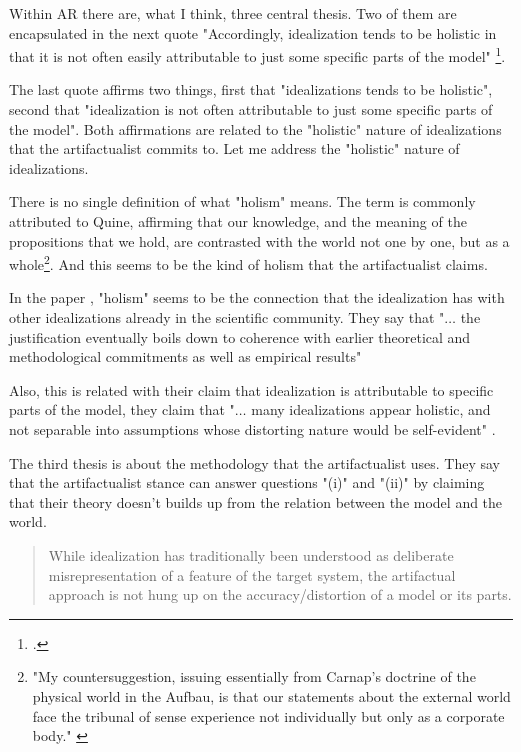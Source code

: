 Within AR there are, what I think, three central thesis.
Two of them are encapsulated in the next quote "Accordingly, idealization tends to be holistic in that it is not often easily attributable to just some specific parts of the model" \footcite[][p. 3]{Carrillo2021-CARAAP-12}.

The last quote affirms two things, first that "idealizations tends to be holistic", second that "idealization is not often attributable to just some specific parts of the model".
Both affirmations are related to the "holistic" nature of idealizations that the artifactualist commits to.
Let me address the "holistic" nature of idealizations.

There is no single definition of what "holism" means.
The term is commonly attributed to Quine, affirming that our knowledge, and the meaning of the propositions that we hold, are contrasted with the world not one by one, but as a whole\footnote{"My countersuggestion, issuing essentially from  Carnap's doctrine of the physical world in the Aufbau, is that our  statements about the external world face the tribunal of sense experience not individually but only as a corporate body." \parencite[][p. 38]{Quine1951} }.
And this seems to be the kind of holism that the artifactualist claims.

In the paper , "holism" seems to be the connection that the idealization has with other idealizations already in the scientific community.
They say that "$\ldots$ the justification eventually boils down to coherence with earlier theoretical and methodological commitments as well as empirical results" \parencite[][p. 52]{Carrillo2022}

Also, this is related with their claim that idealization is attributable to specific parts of the model, they claim that "$\ldots$ many idealizations appear holistic, and not separable into assumptions whose distorting nature would be self-evident" \parencite[][p. 57]{Carrillo2022}.

The third thesis is about the methodology that the artifactualist uses.
They say that the artifactualist stance can answer questions "(i)" and "(ii)" by claiming that their theory doesn't builds up from the relation between the model and the world.

\begin{quote}
	While idealization has traditionally been understood as deliberate misrepresentation of a feature of the target system, the artifactual  approach is not hung up on the accuracy/distortion of a model or its parts. \parencite[][p. 8]{Carrillo2021-CARAAP-12}
\end{quote}

